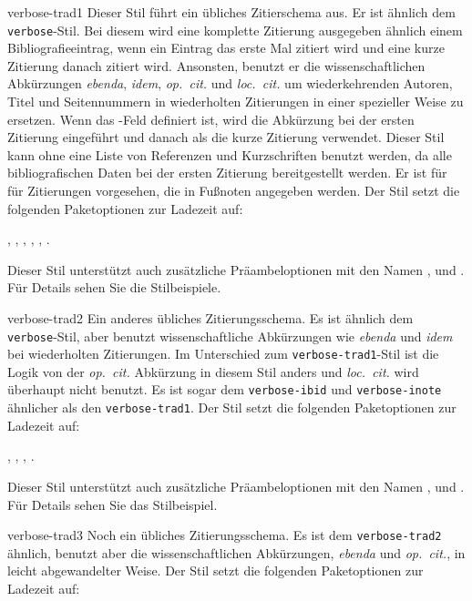 \documentclass{ltxdockit}[2011/03/25]
\begin{document}
\begin{marglist}
\item[verbose-trad1] Dieser Stil führt ein übliches Zitierschema aus.
Er ist ähnlich dem
\texttt{verbose}-Stil. Bei diesem wird eine komplette Zitierung ausgegeben
ähnlich einem Bibliografieeintrag, wenn ein Eintrag das erste Mal zitiert
wird und eine kurze Zitierung danach zitiert wird. Ansonsten, benutzt er die
wissenschaftlichen Abkürzungen \emph{ebenda}, \emph{idem}, \emph{op.~cit.}
und \emph{loc.~cit.} um wiederkehrenden Autoren, Titel und Seitennummern in
wiederholten Zitierungen in einer spezieller Weise zu ersetzen. Wenn das
-Feld definiert ist, wird die Abkürzung bei der ersten
Zitierung eingeführt und danach als die kurze Zitierung verwendet. Dieser Stil
kann ohne eine Liste von Referenzen und Kurzschriften benutzt werden, da alle
bibliografischen Daten bei der ersten Zitierung bereitgestellt werden. Er ist
für für Zitierungen vorgesehen, die in Fußnoten angegeben werden. Der Stil setzt
die folgenden Paketoptionen zur Ladezeit auf: 

, , , , , .

Dieser Stil unterstützt auch zusätzliche
Präambeloptionen mit den Namen ,  und
. Für Details sehen Sie die Stilbeispiele.      

\item[verbose-trad2] Ein anderes übliches Zitierungsschema. Es ist ähnlich
dem \texttt{verbose}-Stil,
aber benutzt wissenschaftliche Abkürzungen wie \emph{ebenda} und \emph{idem} bei
wiederholten Zitierungen. Im Unterschied zum \texttt{verbose-trad1}-Stil ist
die Logik von der \emph{op.~cit.} Abkürzung in diesem Stil anders und
\emph{loc.~cit.} wird überhaupt nicht benutzt. Es ist sogar dem
\texttt{verbose-ibid} und \texttt{verbose-inote} ähnlicher als den
\texttt{verbose-trad1}. Der Stil setzt die folgenden Paketoptionen zur
Ladezeit auf:

, , , . 

Dieser Stil
unterstützt auch zusätzliche Präambeloptionen mit den Namen ,
 und . Für Details sehen Sie das Stilbeispiel.        

\item[verbose-trad3] Noch ein übliches Zitierungsschema. Es ist dem 
\texttt{verbose-trad2} ähnlich,
benutzt aber die wissenschaftlichen Abkürzungen, \emph{ebenda} und
\emph{op.~cit.}, in leicht abgewandelter Weise. Der Stil setzt die folgenden
Paketoptionen zur Ladezeit auf: 


\end{marglist}
\end{document}
